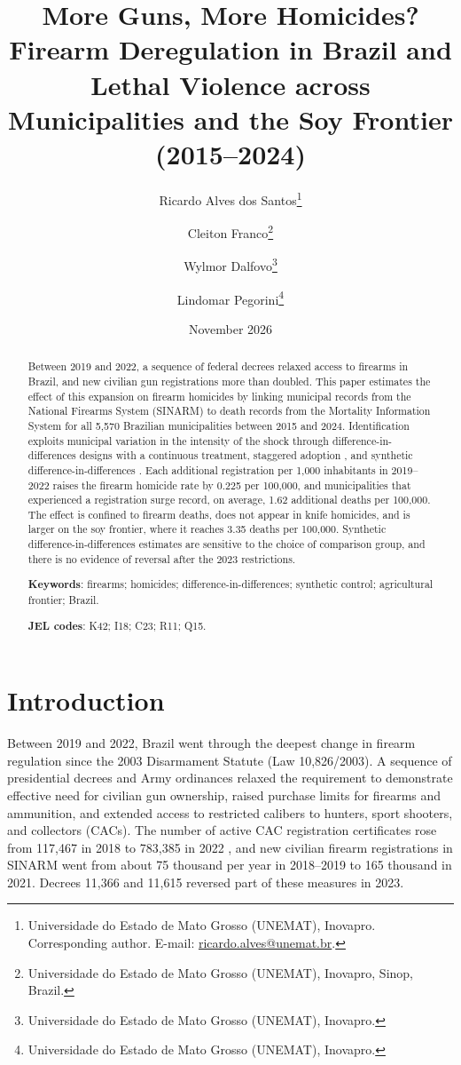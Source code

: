 \documentclass[11pt,a4paper]{article}
\title{\textbf{More Guns, More Homicides? Firearm Deregulation in Brazil and Lethal Violence across Municipalities and the Soy Frontier (2015--2024)}}
\author{Ricardo Alves dos Santos\thanks{Universidade do Estado de Mato Grosso (UNEMAT), Inovapro. Corresponding author. E-mail: \href{mailto:ricardo.alves@unemat.br}{ricardo.alves@unemat.br}.}
\and Cleiton Franco\thanks{Universidade do Estado de Mato Grosso (UNEMAT), Inovapro, Sinop, Brazil.}
\and Wylmor Dalfovo\thanks{Universidade do Estado de Mato Grosso (UNEMAT), Inovapro.}
\and Lindomar Pegorini\thanks{Universidade do Estado de Mato Grosso (UNEMAT), Inovapro.}}
\date{November 2026}
\begin{document}
\maketitle
\thispagestyle{empty}

\begin{abstract}
\noindent Between 2019 and 2022, a sequence of federal decrees relaxed access to firearms in Brazil, and new civilian gun registrations more than doubled. This paper estimates the effect of this expansion on firearm homicides by linking municipal records from the National Firearms System (SINARM) to death records from the Mortality Information System for all 5,570 Brazilian municipalities between 2015 and 2024. Identification exploits municipal variation in the intensity of the shock through difference-in-differences designs with a continuous treatment, staggered adoption \citep{callaway2021}, and synthetic difference-in-differences \citep{arkhangelsky2021}. Each additional registration per 1,000 inhabitants in 2019--2022 raises the firearm homicide rate by 0.225 per 100,000, and municipalities that experienced a registration surge record, on average, 1.62 additional deaths per 100,000. The effect is confined to firearm deaths, does not appear in knife homicides, and is larger on the soy frontier, where it reaches 3.35 deaths per 100,000. Synthetic difference-in-differences estimates are sensitive to the choice of comparison group, and there is no evidence of reversal after the 2023 restrictions.

\vspace{0.6em}
\noindent\textbf{Keywords}: firearms; homicides; difference-in-differences; synthetic control; agricultural frontier; Brazil.

\noindent\textbf{JEL codes}: K42; I18; C23; R11; Q15.
\end{abstract}

\newpage
\setcounter{page}{1}

\section{Introduction}

Between 2019 and 2022, Brazil went through the deepest change in firearm regulation since the 2003 Disarmament Statute (Law 10,826/2003). A sequence of presidential decrees and Army ordinances relaxed the requirement to demonstrate effective need for civilian gun ownership, raised purchase limits for firearms and ammunition, and extended access to restricted calibers to hunters, sport shooters, and collectors (CACs). The number of active CAC registration certificates rose from 117,467 in 2018 to 783,385 in 2022 \citep{fbsp2023}, and new civilian firearm registrations in SINARM went from about 75 thousand per year in 2018--2019 to 165 thousand in 2021. Decrees 11,366 and 11,615 reversed part of these measures in 2023.
\end{document}
